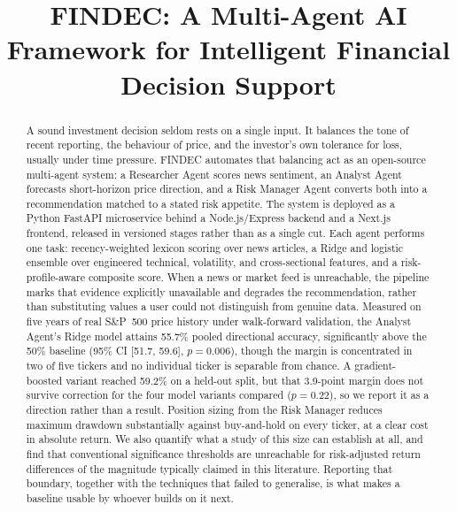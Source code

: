 \documentclass[conference]{IEEEtran}
\begin{document}
\title{FINDEC: A Multi-Agent AI Framework for Intelligent Financial Decision Support}

\author{
}

\maketitle

\begin{abstract}
A sound investment decision seldom rests on a single input. It balances the tone of recent reporting, the behaviour of price, and the investor's own tolerance for loss, usually under time pressure. FINDEC automates that balancing act as an open-source multi-agent system: a Researcher Agent scores news sentiment, an Analyst Agent forecasts short-horizon price direction, and a Risk Manager Agent converts both into a recommendation matched to a stated risk appetite. The system is deployed as a Python FastAPI microservice behind a Node.js/Express backend and a Next.js frontend, released in versioned stages rather than as a single cut. Each agent performs one task: recency-weighted lexicon scoring over news articles, a Ridge and logistic ensemble over engineered technical, volatility, and cross-sectional features, and a risk-profile-aware composite score. When a news or market feed is unreachable, the pipeline marks that evidence explicitly unavailable and degrades the recommendation, rather than substituting values a user could not distinguish from genuine data. Measured on five years of real S\&P~500 price history under walk-forward validation, the Analyst Agent's Ridge model attains 55.7\% pooled directional accuracy, significantly above the 50\% baseline (95\% CI [51.7, 59.6], $p=0.006$), though the margin is concentrated in two of five tickers and no individual ticker is separable from chance. A gradient-boosted variant reached 59.2\% on a held-out split, but that 3.9-point margin does not survive correction for the four model variants compared ($p=0.22$), so we report it as a direction rather than a result. Position sizing from the Risk Manager reduces maximum drawdown substantially against buy-and-hold on every ticker, at a clear cost in absolute return. We also quantify what a study of this size can establish at all, and find that conventional significance thresholds are unreachable for risk-adjusted return differences of the magnitude typically claimed in this literature. Reporting that boundary, together with the techniques that failed to generalise, is what makes a baseline usable by whoever builds on it next.
\end{abstract}
\end{document}
